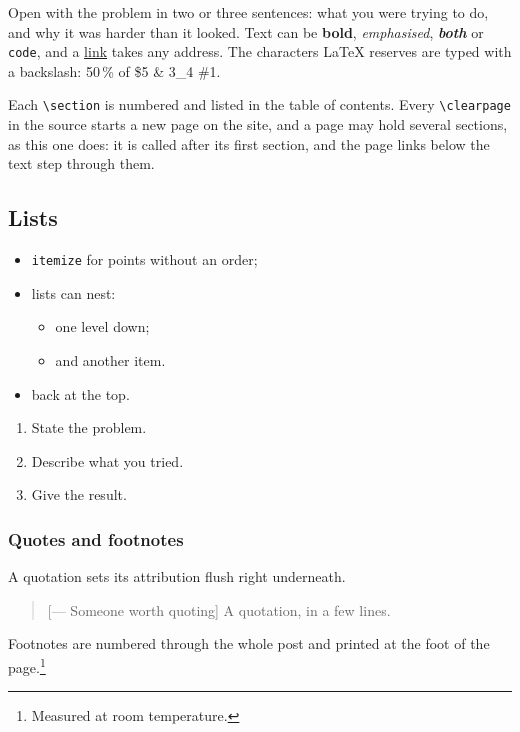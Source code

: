 Open with the problem in two or three sentences: what you were trying to do, and why it was harder than it looked. Text can be \textbf{bold}, \emph{emphasised}, \textbf{\emph{both}} or \texttt{code}, and a \href{https://example.com}{link} takes any address. The characters LaTeX reserves are typed with a backslash: 50\,\% of \$5 \& 3\_4 \#1.

Each \texttt{\textbackslash{}section} is numbered and listed in the table of contents. Every \texttt{\textbackslash{}clearpage} in the source starts a new page on the site, and a page may hold several sections, as this one does: it is called after its first section, and the page links below the text step through them.

\subsection{Lists}

\begin{itemize}
  \item \texttt{itemize} for points without an order;
  \item lists can nest:
    \begin{itemize}
      \item one level down;
      \item and another item.
    \end{itemize}
  \item back at the top.
\end{itemize}

\begin{enumerate}
  \item State the problem.
  \item Describe what you tried.
  \item Give the result.
\end{enumerate}

\subsubsection{Quotes and footnotes}

A quotation sets its attribution flush right underneath.

\begin{quote}[--- Someone worth quoting]
A quotation, in a few lines.
\end{quote}

Footnotes are numbered through the whole post and printed at the foot of the page.\footnote{Measured at room temperature.}

